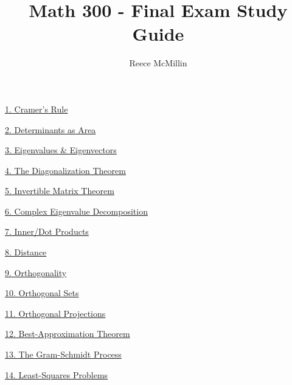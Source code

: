 
\usepackage{systeme}
\usepackage{color, colortbl}
\usepackage{graphicx}
\usepackage{hyperref}
\hypersetup{
    colorlinks,
    citecolor=black,
    filecolor=black,
    linkcolor=black,
    urlcolor=black
}
\graphicspath{ {/} }
\title{Math 300 - Final Exam Study Guide}
\author{Reece McMillin}

\maketitle
\large
\begin{center}
\tableofcontents

\hyperlink{cramer}{1. Cramer's Rule}

\hyperlink{detarea}{2. Determinants as Area}

\hyperlink{eigen}{3. Eigenvalues \& Eigenvectors}

\hyperlink{diag}{4. The Diagonalization Theorem}

\hyperlink{imt}{5. Invertible Matrix Theorem}

\hyperlink{compeig}{6. Complex Eigenvalue Decomposition}

\hyperlink{innerproduct}{7. Inner/Dot Products}

\hyperlink{distance}{8. Distance}

\hyperlink{orth}{9. Orthogonality}

\hyperlink{orthsets}{10. Orthogonal Sets}

\hyperlink{orthproj}{11. Orthogonal Projections}

\hyperlink{approx}{12. Best-Approximation Theorem}

\hyperlink{gram}{13. The Gram-Schmidt Process}

\hyperlink{squares}{14. Least-Squares Problems}
\end{center}
\pagebreak
\normalsize
{}
